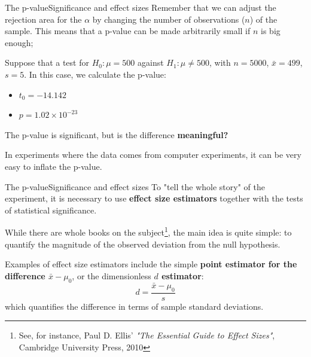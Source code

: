 \begin{frame}{The p-value}{Significance and effect sizes}
  Remember that we can adjust the rejection area for the $\alpha$ by changing the number of observations ($n$) of the sample. This means that a p-value can be made arbitrarily small if $n$ is big enough;\bigskip

  Suppose that a test for $H_0: \mu = 500$ against $H_1: \mu \neq 500$, with $n=5000$, $\bar{x} = 499$, $s=5$. In this case, we calculate the p-value:\medskip

  \begin{itemize}
    \item $t_0 = -14.142$
    \item $p = 1.02 \times 10^{-23}$
  \end{itemize}\bigskip

  The p-value is significant, but is the difference {\bf meaningful?}\bigskip

  In experiments where the data comes from computer experiments, it can be very easy to inflate the p-value.
\end{frame}

\begin{frame}{The p-value}{Significance and effect sizes}
  To "tell the whole story" of the experiment, it is necessary to use {\bf effect size estimators} together with the tests of statistical significance.\bigskip

  While there are whole books on the subject\footnote{See, for instance, Paul D. Ellis' \emph{"The Essential Guide to Effect Sizes"}, Cambridge University Press, 2010}, the main idea is quite simple: to quantify the magnitude of the observed deviation from the null hypothesis.\bigskip

  Examples of effect size estimators include the simple {\bf point estimator for the difference $\bar{x} - \mu_0$}, or the dimensionless {\bf $d$ estimator}:
  \begin{equation*}
    d = \frac{\bar{x} - \mu_0}{s}
  \end{equation*}
  which quantifies the difference in terms of sample standard deviations.
\end{frame}

